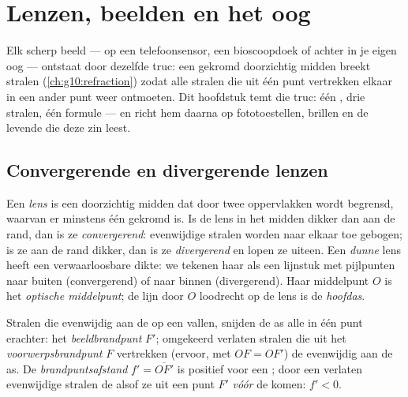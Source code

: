 \chapter{Lenzen, beelden en het oog}\label{ch:g11:lenses-and-eye}

Elk scherp beeld --- op een telefoonsensor, een bioscoopdoek of achter in
je eigen oog --- ontstaat door dezelfde truc: een gekromd doorzichtig
midden breekt stralen (\cref{ch:g10:refraction}) zodat alle stralen die
uit één punt vertrekken elkaar in een ander punt weer ontmoeten. Dit
hoofdstuk temt die truc: één , drie stralen, één formule --- en richt
hem daarna op fototoestellen, brillen en de levende  die deze zin
leest.

\section{Convergerende en divergerende lenzen}

\begin{definition}\label{def:g11:lenses-and-eye:lens}
Een \emph{lens} is een doorzichtig midden dat door twee
oppervlakken wordt begrensd, waarvan er minstens één gekromd is. Is de
lens in het midden dikker dan aan de rand, dan is ze
\emph{convergerend}: evenwijdige stralen
worden naar elkaar toe gebogen; is ze aan de rand dikker, dan is ze
\emph{divergerend} en lopen ze uiteen. Een
\emph{dunne} lens heeft een verwaarloosbare dikte: we
tekenen haar als een lijnstuk met pijlpunten naar buiten (convergerend)
of naar binnen (divergerend). Haar middelpunt $O$ is het \emph{optische
middelpunt}; de lijn door $O$ loodrecht op de
lens is de \emph{hoofdas}.
\end{definition}

\begin{definition}\label{def:g11:lenses-and-eye:focal}
Stralen die evenwijdig aan de  op een  vallen,
snijden de as alle in één punt erachter: het \emph{beeldbrandpunt}%
 $F'$; omgekeerd verlaten stralen die uit het
\emph{voorwerpsbrandpunt} $F$ vertrekken (ervoor, met $OF = OF'$) de 
evenwijdig aan de as. De \emph{brandpuntsafstand}
$f' = \overline{OF'}$ is positief voor een ; door een
 verlaten evenwijdige stralen de  alsof ze uit een
punt $F'$ \emph{vóór} de  komen: $f' < 0$.
\end{definition}

